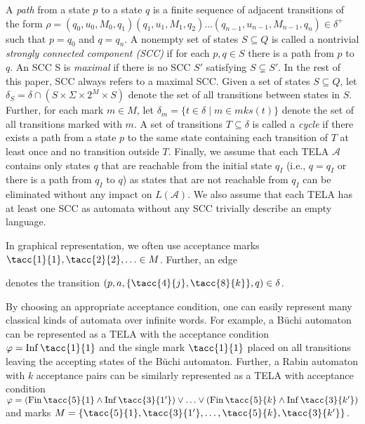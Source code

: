 \documentclass[a4paper,UKenglish,cleveref,autoref,thm-restate]{lipics-v2021}
\newcommand{\todo}[1]{\marginpar{\textcolor{red}{#1}}}
\DeclareMathOperator{\Inf}{\mathsf{Inf}}
\DeclareMathOperator{\Fin}{\mathsf{Fin}}
\newcommand{\mks}{\mathit{mks}}
\newcommand{\mA}{\mathcal{A}}
\begin{document}
A \emph{path} from a state $p$ to a state $q$ is a finite sequence of
adjacent transitions of the form
$\rho=(q_0,u_0,M_0,q_1)(q_1,u_1,M_1,q_2)\ldots(q_{n-1},u_{n-1},M_{n-1},q_n)\in\delta^+$
such that $p=q_0$ and $q=q_n$. A nonempty set of states $S\subseteq Q$
is called a nontrivial \emph{strongly connected component (SCC)} if
for each $p,q\in S$ there is a path from $p$ to $q$. An SCC S is
\emph{maximal} if there is no SCC $S'$ satisfying $S\subsetneq S'$. In
the rest of this paper, SCC always refers to a maximal SCC. Given a
set of states $S\subseteq Q$, let $\delta_S=\delta\cap (S\times \Sigma \times 2^M \times S)$
denote the set of all transitions between states in $S$. Further, for
each mark $m\in M$, let $\delta_m=\{t\in\delta\mid m\in
\mks(t)\}$ denote the set of all transitions
marked with $m$.
A set of transitions $T\subseteq\delta$ is called a \emph{cycle} if
there exists a path from a state $p$ to the same state containing each
transition of $T$ at least once and no transition outside
$T$. Finally, we assume that each TELA $\mA$ contains only states $q$
that are reachable from the initial state $q_I$ (i.e., $q=q_I$ or
there is a path from $q_I$ to $q$) as states that are not reachable
from $q_I$ can be eliminated without any impact on $L(\mA)$. We also
assume that each TELA has at least one SCC as automata without any SCC
trivially describe an empty language.

In graphical representation, we often use acceptance marks
$\tacc{1}{1},\tacc{2}{2},\ldots\in M$. Further, an edge 
denotes the transition $(p,a,\{\tacc{4}{j},\tacc{8}{k}\},q)\in\delta$. 

By choosing an appropriate acceptance condition, one can easily
represent many classical kinds of automata over infinite words. For
example, a Büchi automaton can be represented as a TELA with the
acceptance condition $\varphi = \Inf\tacc{1}{1}$ and the single mark
$\tacc{1}{1}$ placed on all transitions leaving the accepting states
of the Büchi automaton. Further, a Rabin automaton with $k$ acceptance
pairs can be similarly represented as a TELA with acceptance condition
$\varphi = (\Fin\tacc{5}{1} \land \Inf\tacc{3}{1'}) \lor \ldots \lor
(\Fin\tacc{5}{k} \land \Inf\tacc{3}{k'})$ and marks
$M = \{\tacc{5}{1}, \tacc{3}{1'}, \ldots, \tacc{5}{k},
\tacc{3}{k'}\}$.
\end{document}
